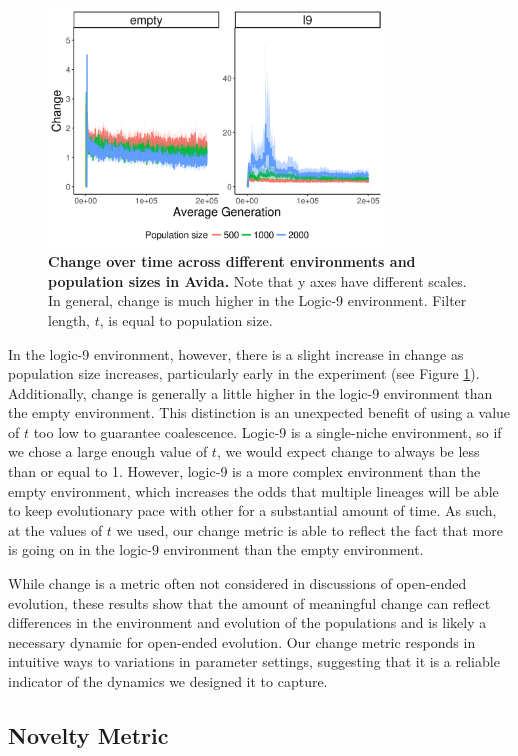 \documentclass[letterpaper]{article}
\begin{document}
\begin{figure}
    \centering
    \includegraphics[width=3.5in]{figs/dolson.avida_env_change.png}
    \caption{\textbf{Change over time across different environments and population sizes in Avida.} Note that y axes have different scales. In general, change is much higher in the Logic-9 environment. Filter length, $t$, is equal to population size.    \label{fig:avida_env_change}}
\end{figure}

In the logic-9 environment, however, there is a slight increase in change as population size increases, particularly early in the experiment (see Figure \ref{fig:avida_env_change}). Additionally, change is generally a little higher in the logic-9 environment than the empty environment. This distinction is an unexpected benefit of using a value of $t$ too low to guarantee coalescence. Logic-9 is a single-niche environment, so if we chose a large enough value of $t$, we would expect change to always be less than or equal to 1. However, logic-9 is a more complex environment than the empty environment, which increases the odds that multiple lineages will be able to keep evolutionary pace with other for a substantial amount of time. As such, at the values of $t$ we used, our change metric is able to reflect the fact that more is going on in the logic-9 environment than the empty environment. 

While change is a metric often not considered in discussions of open-ended evolution, these results show that the amount of meaningful change can reflect differences in the environment and evolution of the populations and is likely a necessary dynamic for open-ended evolution. Our change metric responds in intuitive ways to variations in parameter settings, suggesting that it is a reliable indicator of the dynamics we designed it to capture. 

\subsection{Novelty Metric}
\end{document}

